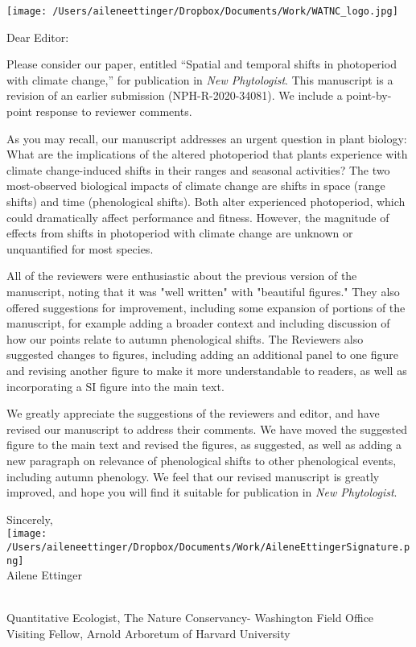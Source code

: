 \documentclass[10.5pt,a4paper]{letter}
\begin{document}
\begin{letter}{}
\texttt{[image: /Users/aileneettinger/Dropbox/Documents/Work/WATNC\_logo.jpg]}

\opening{Dear Editor:}
Please consider our paper, entitled ``Spatial and temporal shifts in photoperiod with climate change,'' for publication in  \emph{New Phytologist}. This manuscript is a revision of an earlier submission (NPH-R-2020-34081). We include a point-by-point response to reviewer comments.

\par As you may recall, our manuscript addresses an urgent question in plant biology: What are the implications
of the altered photoperiod that plants experience with climate change-induced shifts in their ranges and seasonal activities? The two most-observed biological impacts of climate change are shifts in space (range shifts) and time (phenological shifts). Both alter experienced photoperiod, which could dramatically affect performance and fitness. However, the magnitude of effects from shifts in photoperiod with climate change are unknown or unquantified for most species. 

\par All of the reviewers were enthusiastic about the previous version of the manuscript, noting that it was "well written" with "beautiful figures." They also offered suggestions for improvement, including some expansion of portions of the manuscript, for example adding a broader context and including discussion of how our points relate to autumn phenological shifts. The Reviewers also suggested changes to figures, including adding an additional panel to one figure and revising another figure to make it more understandable to readers, as well as incorporating a SI figure into the main text. 

\par We greatly appreciate the suggestions of the reviewers and editor, and have revised our manuscript to address their comments. We have moved the suggested figure to the main text and revised the figures, as suggested, as well as adding a new paragraph on relevance of phenological shifts to other phenological events, including autumn phenology. We feel that our revised manuscript is greatly improved, and hope you will find it suitable for publication in \emph{New Phytologist}.

\par Sincerely,\\

\texttt{[image: /Users/aileneettinger/Dropbox/Documents/Work/AileneEttingerSignature.png]} \\
Ailene Ettinger
\begin{footnotesize}\\
Quantitative Ecologist, The Nature Conservancy- Washington Field Office\\
Visiting Fellow, Arnold Arboretum of Harvard University 
\end{footnotesize}


\end{letter}
\end{document}

